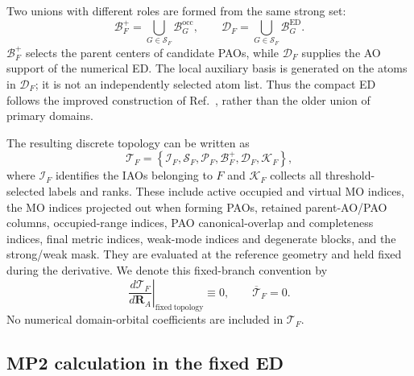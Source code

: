 \documentclass[11pt]{article}
\begin{document}
Two unions with different roles are formed from the same strong set:
\begin{equation}
 \mathcal B_F^+=
 \bigcup_{G\in\mathcal S_F}\mathcal B_G^{\mathrm{occ}},
 \qquad
 \mathcal D_F=
 \bigcup_{G\in\mathcal S_F}\mathcal B_G^{\mathrm{ED}}.
 \label{eq:workflow-two-ed-lists}
\end{equation}
$\mathcal B_F^+$ selects the parent centers of candidate PAOs, while
$\mathcal D_F$ supplies the AO support of the numerical ED.  The local
auxiliary basis is generated on the atoms in $\mathcal D_F$; it is not an
independently selected atom list.  Thus the compact ED follows the improved
construction of Ref.~\cite{nagy2016}, rather than the older union of primary
domains.

The resulting discrete topology can be written as
\begin{equation}
 \mathcal T_F=
 \left\{
   \mathcal I_F,\mathcal S_F,\mathcal P_F,
   \mathcal B_F^+,\mathcal D_F,\mathcal K_F
 \right\},
 \label{eq:workflow-static-topology}
\end{equation}
where $\mathcal I_F$ identifies the IAOs belonging to $F$ and
$\mathcal K_F$ collects all threshold-selected labels and ranks.  These
include active occupied and virtual MO indices, the MO indices projected out
when forming PAOs, retained parent-AO/PAO columns, occupied-range indices, PAO
canonical-overlap and completeness indices, final metric indices, weak-mode
indices and degenerate blocks, and the strong/weak mask.  They are evaluated
at the reference geometry and held
fixed during the derivative.  We denote this fixed-branch convention by
\begin{equation}
 \left.\frac{d\mathcal T_F}{d\mathbf R_A}\right|_{\mathrm{fixed\ topology}}
 \equiv0,
 \qquad
 \overline{\mathcal T}_F=0.
 \label{eq:workflow-static-gradient}
\end{equation}
No numerical domain-orbital coefficients are included in $\mathcal T_F$.

\subsection{MP2 calculation in the fixed ED}
\end{document}
